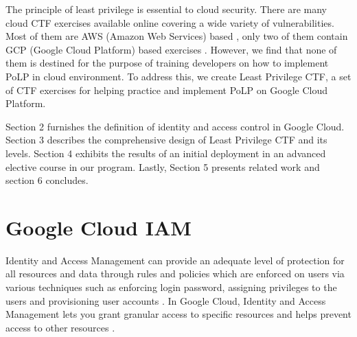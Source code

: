 \documentclass[sigconf]{acmart}
\begin{document}
The principle of least privilege is essential to cloud security. There are many cloud CTF exercises available online covering a wide variety of vulnerabilities. Most of them are AWS (Amazon Web Services) based \cite{flaws} \cite{flaws2} \cite{cloudgoat} \cite{serverlessgoat}, only two of them contain  GCP (Google Cloud Platform) based exercises \cite{thunder-ctf} \cite{QWIKLABS}.  However, we find that none of them is destined for the purpose of   training developers on how to implement PoLP in cloud environment. To address this, we create Least Privilege CTF, a set of CTF exercises for helping practice and implement PoLP on Google Cloud Platform.

Section 2 furnishes the definition of identity and access control in Google Cloud. Section 3 describes the comprehensive design of Least Privilege CTF and its levels. Section 4 exhibits the results of an initial deployment in an advanced elective course in our program. Lastly, Section 5 presents related work and section 6 concludes.

\section{Google Cloud IAM}
Identity and Access Management can provide an adequate level of protection for all resources and data through rules and policies which are enforced on users via various techniques such as enforcing login password, assigning privileges to the users and provisioning user accounts \cite{AlmullaSameeraAbdulrahmanandYeun2010}.
In Google Cloud,  Identity and Access Management lets you grant granular access to specific resources and helps prevent access to other resources \cite{Googlecloudiam}.
\end{document}
